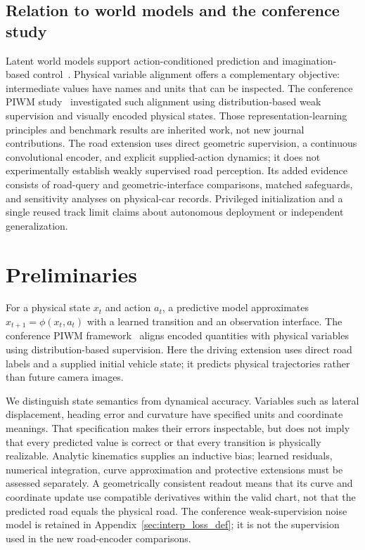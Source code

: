 \documentclass[preprint,12pt]{elsarticle}
\begin{document}
\subsection{Relation to world models and the conference study}\label{sec:rw_wm}\label{sec:rw_repr}
Latent world models support action-conditioned prediction and imagination-based
control~\cite{ha2018world,hafner2023mastering}. Physical variable alignment offers
a complementary objective: intermediate values have names and units that can
be inspected. The conference PIWM study~\cite{piwm_conf} investigated such
alignment using distribution-based weak supervision and visually encoded
physical states. Those representation-learning principles and benchmark
results are inherited work, not new journal contributions. The road extension
uses direct geometric supervision, a continuous convolutional encoder, and
explicit supplied-action dynamics; it does not experimentally establish weakly
supervised road perception. Its added evidence consists of road-query and
geometric-interface comparisons, matched safeguards, and sensitivity analyses
on physical-car records. Privileged initialization and a single reused track
limit claims about autonomous deployment or independent generalization.

\section{Preliminaries}\label{sec:preliminaries}
For a physical state $x_t$ and action $a_t$, a predictive model approximates
$x_{t+1}=\phi(x_t,a_t)$ with a learned transition and an observation interface.
The conference PIWM framework~\cite{piwm_conf} aligns encoded quantities with
physical variables using distribution-based supervision. Here the driving
extension uses direct road labels and a supplied initial vehicle state; it
predicts physical trajectories rather than future camera images.

We distinguish state semantics from dynamical accuracy. Variables such as
lateral displacement, heading error and curvature have specified units and
coordinate meanings. That specification makes their errors inspectable, but
does not imply that every predicted value is correct or that every transition
is physically realizable. Analytic kinematics supplies an inductive bias;
learned residuals, numerical integration, curve approximation and protective
extensions must be assessed separately. A geometrically consistent readout
means that its curve and coordinate update use compatible derivatives within
the valid chart, not that the predicted road equals the physical road.
The conference weak-supervision noise model is retained in
Appendix~\ref{sec:interp_loss_def}; it is not the supervision used in the new
road-encoder comparisons.
\end{document}

